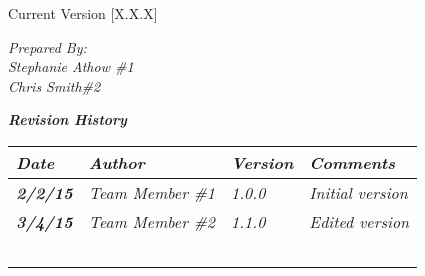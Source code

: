


Current Version [X.X.X]
\vspace*{5mm}

{\color{MSBlue3}
\noindent
\textit{Prepared By:}\\
\textit{Stephanie Athow \#1}\\
\textit{Chris Smith\#2}
}

\vfill
\noindent
{\color{color02} \textit{\textbf{Revision History}}}\\
\begin{tabular}{|>{\raggedright}p{1.5cm}|>{\raggedright}p{3cm}|>{\raggedright}p{1.5cm}|>{\raggedright}p{9cm}|}
\hline
\textit{\textbf{Date}} &  \textit{\textbf{Author}} & \textit{\textbf{Version}} & \textit{\textbf{Comments}}\tabularnewline
\hline
 \textit{\textbf{2/2/15}} & \textit{Team Member \#1} & \textit{1.0.0} & \textit{Initial version}\tabularnewline
\hline
\textit{\textbf{3/4/15}} & \textit{Team Member \#2} & \textit{1.1.0} & \textit{Edited version}\tabularnewline
\hline
 &  &  & \tabularnewline
 \hline
 &  &  & \tabularnewline
\hline
 &  &  & \tabularnewline
\hline
 &  &  & \tabularnewline
\hline
 &  &  & \tabularnewline
\hline
\end{tabular}
\vfill


